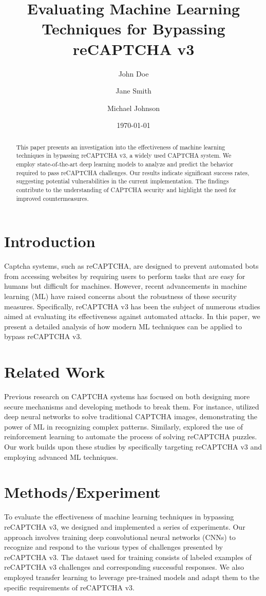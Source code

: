 \documentclass{article}
\title{Evaluating Machine Learning Techniques for Bypassing reCAPTCHA v3}
\author{John Doe \and Jane Smith \and Michael Johnson}
\date{\today}
\begin{document}
\maketitle

\begin{abstract}
This paper presents an investigation into the effectiveness of machine learning techniques in bypassing reCAPTCHA v3, a widely used CAPTCHA system. We employ state-of-the-art deep learning models to analyze and predict the behavior required to pass reCAPTCHA challenges. Our results indicate significant success rates, suggesting potential vulnerabilities in the current implementation. The findings contribute to the understanding of CAPTCHA security and highlight the need for improved countermeasures.
\end{abstract}

\section{Introduction}
Captcha systems, such as reCAPTCHA, are designed to prevent automated bots from accessing websites by requiring users to perform tasks that are easy for humans but difficult for machines. However, recent advancements in machine learning (ML) have raised concerns about the robustness of these security measures. Specifically, reCAPTCHA v3 has been the subject of numerous studies aimed at evaluating its effectiveness against automated attacks. In this paper, we present a detailed analysis of how modern ML techniques can be applied to bypass reCAPTCHA v3.

\section{Related Work}
Previous research on CAPTCHA systems has focused on both designing more secure mechanisms and developing methods to break them. For instance, \cite{chen2020deep} utilized deep neural networks to solve traditional CAPTCHA images, demonstrating the power of ML in recognizing complex patterns. Similarly, \cite{kumar2020breaking} explored the use of reinforcement learning to automate the process of solving reCAPTCHA puzzles. Our work builds upon these studies by specifically targeting reCAPTCHA v3 and employing advanced ML techniques.

\section{Methods/Experiment}
To evaluate the effectiveness of machine learning techniques in bypassing reCAPTCHA v3, we designed and implemented a series of experiments. Our approach involves training deep convolutional neural networks (CNNs) to recognize and respond to the various types of challenges presented by reCAPTCHA v3. The dataset used for training consists of labeled examples of reCAPTCHA v3 challenges and corresponding successful responses. We also employed transfer learning to leverage pre-trained models and adapt them to the specific requirements of reCAPTCHA v3.
\end{document}
